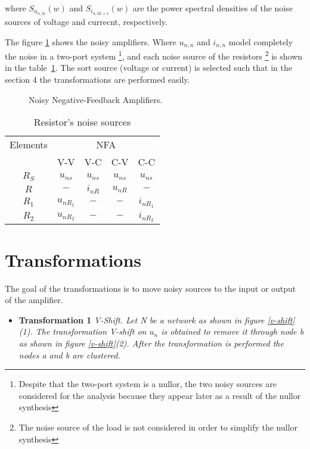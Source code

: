 \documentclass[letterpaper]{ecctd01}
\begin{document}
where $S_{u_{n,2i}}(w)$ and $S_{i_{n,2k+1}}(w)$ are the power spectral densities of the noise sources of voltage and currecnt, respectively.

The figure \ref{figure3} shows the noisy amplifiers. Where $u_{n,n}$ and $i_{n,n}$ model completely the noise in a two-port system \cite{haus} \footnote{Despite that the two-port system is a nullor, the two noisy sources are considered for the analysis because they appear later as a result of the nullor synthesis}, and each noise source of the resistors \footnote{The noise source of the load is not considered in order to simplify the nullor synthesis} is shown in the table~\ref{tbl:noise_res}. The sort source (voltage or current) is selected such that in the section 4 the transformations are performed easily.

\begin{figure}[hbtp]
\centerline{
\epsfxsize=70mm
}
\caption{Noisy Negative-Feedback Amplifiers.}
\label{figure3}
\end{figure} 

\begin{table}
\begin{center}
\begin{tabular}{|c|c|c|c|c|}
\hline
 Elements &  \multicolumn{4}{|c|}{NFA} \\
 \cline{2-5}
  &  V-V &  V-C &  C-V & C-C \\
\hline
$R_S$ &  $u_{ns}$ &  $u_{ns}$ &  $u_{ns}$ & $u_{ns}$ \\
\hline
$R$ & $-$ & $i_{nR}$ & $u_{nR}$ & $-$ \\
\hline
$R_1$ & $u_{nR_1}$ & $-$ & $-$ & $i_{nR_1}$ \\
\hline
$R_2$ & $u_{nR_2}$ & $-$ & $-$ & $i_{nR_2}$ \\
\hline
\end{tabular}
\end{center}
\caption{Resistor's noise sources}
\label{tbl:noise_res}
\end{table}

\section{Transformations}

The goal of the transformations is to move noisy sources to the input or output of the amplifier.

\begin{itemize}
\item {\bf Transformation 1} {\it V-Shift. Let N be a network as shown in figure {\ref{v-shift}(1)}. The transformation V-shift on $u_n$ is obtained to remove it through node b as shown in figure {\ref{v-shift}(2)}. After the transformation is performed the nodes a and b are clustered.}
\end{itemize}
\end{document}
